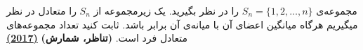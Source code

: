 مجموعه‌ی $S_n = \{1, 2, \dots ,n\}$ را در نظر بگیرید.
یک زیرمجموعه از $S_n$ را متعادل در نظر میگیریم هرگاه میانگین اعضای آن با میانه‌ی آن برابر باشد.
ثابت کنید تعداد مجموعه‌های متعادل فرد است.
\textbf{(تناظر، شمارش)}
\href{https://artofproblemsolving.com/community/c6h1414673p7967513}{\textbf{(2017)}}